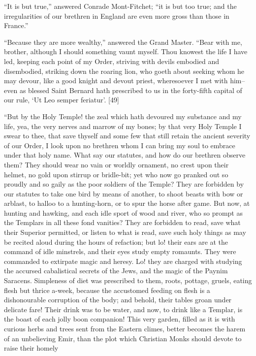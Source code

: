``It is but true,'' answered Conrade Mont-Fitchet; ``it is but too true;
and the irregularities of our brethren in England are even more gross
than those in France.''

``Because they are more wealthy,'' answered the Grand Master. ``Bear
with me, brother, although I should something vaunt myself. Thou knowest
the life I have led, keeping each point of my Order, striving with
devils embodied and disembodied, striking down the roaring lion, who
goeth about seeking whom he may devour, like a good knight and devout
priest, wheresoever I met with him--even as blessed Saint Bernard hath
prescribed to us in the forty-fifth capital of our rule, `Ut Leo semper
feriatur'. {[}49{]}

``But by the Holy Temple! the zeal which hath devoured my substance and
my life, yea, the very nerves and marrow of my bones; by that very Holy
Temple I swear to thee, that save thyself and some few that still retain
the ancient severity of our Order, I look upon no brethren whom I can
bring my soul to embrace under that holy name. What say our statutes,
and how do our brethren observe them? They should wear no vain or
worldly ornament, no crest upon their helmet, no gold upon stirrup or
bridle-bit; yet who now go pranked out so proudly and so gaily as the
poor soldiers of the Temple? They are forbidden by our statutes to take
one bird by means of another, to shoot beasts with bow or arblast, to
halloo to a hunting-horn, or to spur the horse after game. But now, at
hunting and hawking, and each idle sport of wood and river, who so
prompt as the Templars in all these fond vanities? They are forbidden to
read, save what their Superior permitted, or listen to what is read,
save such holy things as may be recited aloud during the hours of
refaction; but lo! their ears are at the command of idle minstrels, and
their eyes study empty romaunts. They were commanded to extirpate magic
and heresy. Lo! they are charged with studying the accursed cabalistical
secrets of the Jews, and the magic of the Paynim Saracens. Simpleness of
diet was prescribed to them, roots, pottage, gruels, eating flesh but
thrice a-week, because the accustomed feeding on flesh is a
dishonourable corruption of the body; and behold, their tables groan
under delicate fare! Their drink was to be water, and now, to drink like
a Templar, is the boast of each jolly boon companion! This very garden,
filled as it is with curious herbs and trees sent from the Eastern
climes, better becomes the harem of an unbelieving Emir, than the plot
which Christian Monks should devote to raise their homely
